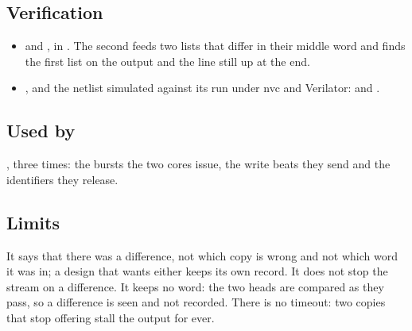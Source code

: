 \subsection*{Verification}

\begin{itemize}
\item {} and
, in
. The second feeds two lists that differ
in their middle word and finds the first list on the output and the
line still up at the end.
\item {}, and the netlist simulated
against its run under nvc and Verilator:
\allowbreak{} and
.
\end{itemize}

\subsection*{Used by}

, three times: the bursts the two cores issue, the write
beats they send and the identifiers they release.

\subsection*{Limits}

It says that there was a difference, not which copy is wrong and not
which word it was in; a design that wants either keeps its own record.
It does not stop the stream on a difference. It keeps no word: the two
heads are compared as they pass, so a difference is seen and not
recorded. There is no timeout: two copies that stop offering stall the
output for ever.
